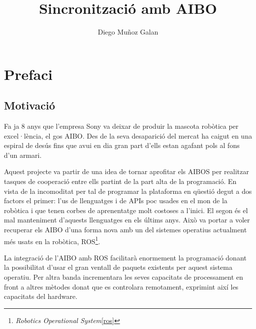 \documentclass[12pt,a4paper,final,twoside]{article}
\title{Sincronització amb AIBO}
\author{Diego Muñoz Galan}
\begin{document}
\maketitle
\thispagestyle{empty}

\newpage
\paragraph{}
\thispagestyle{empty}
\cleardoublepage

\setcounter{page}{1}

\begin{abstract}

\end{abstract}

\newpage
\cleardoublepage

\tableofcontents
\newpage
\listoffigures
\newpage
\listoftables
\newpage


\section{Prefaci}
\subsection{Motivació}
Fa ja 8 anys que l'empresa Sony va deixar de produir la mascota robòtica per excel·lència, el gos AIBO. Des de la seva desaparició del mercat ha caigut en una espiral de desús fins que avui en dia gran part d'ells estan agafant pols al fons d'un armari.

Aquest projecte va partir de una idea de tornar aprofitar els AIBOS per realitzar tasques de cooperació entre ells partint de la part alta de la programació. En vista de la incomoditat per tal de programar la plataforma en qüestió degut a dos factors el primer: l'us de llenguatges i de APIs poc usades en el mon de la robòtica i que tenen corbes de aprenentatge molt costoses a l'inici. El segon és el mal manteniment d'aquests llenguatges en els últims anys.
Això va portar a voler recuperar els AIBO d'una forma nova amb un del sistemes operatius actualment més usats en la robòtica, ROS\footnote{\textit{Robotics Operational System}\ref{ros}}. 

La integració de l'AIBO amb ROS facilitarà enormement la programació donant la possibilitat d'usar el gran ventall de paquets existents per aquest sistema operatiu. Per altra banda incrementara les seves capacitats de processament en front a altres mètodes donat que es controlara remotament, exprimint així les capacitats del hardware.
\end{document}
